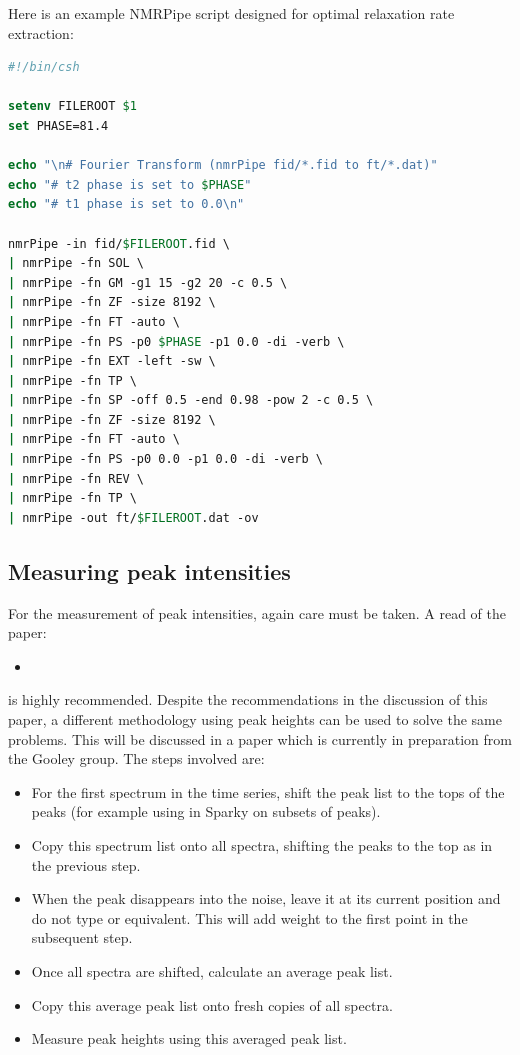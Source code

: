 Here is an example NMRPipe script designed for optimal relaxation rate extraction:

\begin{lstlisting}[language=csh]
#!/bin/csh

setenv FILEROOT $1
set PHASE=81.4

echo "\n# Fourier Transform (nmrPipe fid/*.fid to ft/*.dat)"
echo "# t2 phase is set to $PHASE"
echo "# t1 phase is set to 0.0\n"

nmrPipe -in fid/$FILEROOT.fid \
| nmrPipe -fn SOL \
| nmrPipe -fn GM -g1 15 -g2 20 -c 0.5 \
| nmrPipe -fn ZF -size 8192 \
| nmrPipe -fn FT -auto \
| nmrPipe -fn PS -p0 $PHASE -p1 0.0 -di -verb \
| nmrPipe -fn EXT -left -sw \
| nmrPipe -fn TP \
| nmrPipe -fn SP -off 0.5 -end 0.98 -pow 2 -c 0.5 \
| nmrPipe -fn ZF -size 8192 \
| nmrPipe -fn FT -auto \
| nmrPipe -fn PS -p0 0.0 -p1 0.0 -di -verb \
| nmrPipe -fn REV \
| nmrPipe -fn TP \
| nmrPipe -out ft/$FILEROOT.dat -ov
\end{lstlisting}



\subsection{Measuring peak intensities}

For the measurement of peak intensities, again care must be taken.  A read of the paper:

\begin{itemize}
\item {}
\end{itemize}

is highly recommended.  Despite the recommendations in the discussion of this paper, a different methodology using peak heights can be used to solve the same problems.  This will be discussed in a paper which is currently in preparation from the Gooley group.  The steps involved are:

\begin{itemize}
\item For the first spectrum in the time series, shift the peak list to the tops of the peaks (for example using  in Sparky on subsets of peaks).
\item Copy this \nth{1} spectrum list onto all spectra, shifting the peaks to the top as in the previous step.
\item When the peak disappears into the noise, leave it at its current position and do not type  or equivalent.  This will add weight to the first point in the subsequent step.
\item Once all spectra are shifted, calculate an average peak list.
\item Copy this average peak list onto fresh copies of all spectra.
\item Measure peak heights using this averaged peak list.
\end{itemize}

